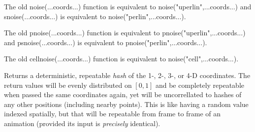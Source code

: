 \documentclass[11pt,letterpaper]{book}
\begin{document}
The old {\cf noise(...coords...)} function is equivalent to
{\cf noise("uperlin",...coords...)} and {\cf snoise(...coords...)}
is equivalent to {\cf noise("perlin",...coords...)}.
\apiend



The old {\cf pnoise(...coords...)} function is equivalent to
{\cf pnoise("uperlin",...coords...)} and {\cf psnoise(...coords...)}
is equivalent to {\cf pnoise("perlin",...coords...)}.
\apiend

The old {\cf cellnoise(...coords...)} function is equivalent to
{\cf noise("cell",...coords...)}.
\apiend

Returns a deterministic, repeatable \emph{hash} of the 1-, 2-, 3-, or
4-D coordinates.  The return values will be evenly distributed on
$[0,1]$ and be completely repeatable when passed the same coordinates
again, yet will be uncorrellated to hashes of any other positions
(including nearby points).  This is like having a random value indexed
spatially, but that will be repeatable from frame to frame of an
animation (provided its input is \emph{precisely} identical).
\end{document}
